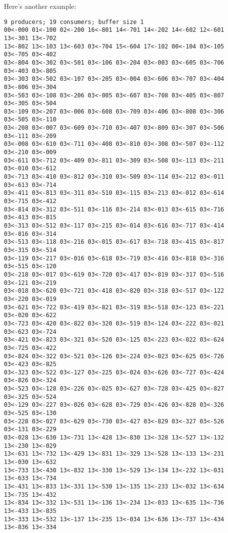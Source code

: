 \documentclass{concdistfoils}
\begin{document}
\begin{slide}
\begin{note}
Here's another example:
\begin{verbatim}
9 producers; 19 consumers; buffer size 1
00<-000 01<-100 02<-200 16<-801 14<-701 14<-202 14<-602 12<-601 13<-301 13<-702
13<-802 13<-103 13<-603 03<-704 15<-604 17<-102 00<-104 03<-105 03<-705 03<-402
03<-804 03<-302 03<-501 03<-106 03<-204 03<-003 03<-605 03<-706 03<-403 03<-805
03<-303 03<-502 03<-107 03<-205 03<-004 03<-606 03<-707 03<-404 03<-806 03<-304
03<-503 03<-108 03<-206 03<-005 03<-607 03<-708 03<-405 03<-807 03<-305 03<-504
03<-109 03<-207 03<-006 03<-608 03<-709 03<-406 03<-808 03<-306 03<-505 03<-110
03<-208 03<-007 03<-609 03<-710 03<-407 03<-809 03<-307 03<-506 03<-111 03<-209
03<-008 03<-610 03<-711 03<-408 03<-810 03<-308 03<-507 03<-112 03<-210 03<-009
03<-611 03<-712 03<-409 03<-811 03<-309 03<-508 03<-113 03<-211 03<-010 03<-612
03<-713 03<-410 03<-812 03<-310 03<-509 03<-114 03<-212 03<-011 03<-613 03<-714
03<-411 03<-813 03<-311 03<-510 03<-115 03<-213 03<-012 03<-614 03<-715 03<-412
03<-814 03<-312 03<-511 03<-116 03<-214 03<-013 03<-615 03<-716 03<-413 03<-815
03<-313 03<-512 03<-117 03<-215 03<-014 03<-616 03<-717 03<-414 03<-816 03<-314
03<-513 03<-118 03<-216 03<-015 03<-617 03<-718 03<-415 03<-817 03<-315 03<-514
03<-119 03<-217 03<-016 03<-618 03<-719 03<-416 03<-818 03<-316 03<-515 03<-120
03<-218 03<-017 03<-619 03<-720 03<-417 03<-819 03<-317 03<-516 03<-121 03<-219
03<-018 03<-620 03<-721 03<-418 03<-820 03<-318 03<-517 03<-122 03<-220 03<-019
03<-621 03<-722 03<-419 03<-821 03<-319 03<-518 03<-123 03<-221 03<-020 03<-622
03<-723 03<-420 03<-822 03<-320 03<-519 03<-124 03<-222 03<-021 03<-623 03<-724
03<-421 03<-823 03<-321 03<-520 03<-125 03<-223 03<-022 03<-624 03<-725 03<-422
03<-824 03<-322 03<-521 03<-126 03<-224 03<-023 03<-625 03<-726 03<-423 03<-825
03<-323 03<-522 03<-127 03<-225 03<-024 03<-626 03<-727 03<-424 03<-826 03<-324
03<-523 03<-128 03<-226 03<-025 03<-627 03<-728 03<-425 03<-827 03<-325 03<-524
03<-129 03<-227 03<-026 03<-628 03<-729 03<-426 03<-828 03<-326 03<-525 03<-130
03<-228 03<-027 03<-629 03<-730 03<-427 03<-829 03<-327 03<-526 03<-131 03<-229
03<-028 13<-630 13<-731 13<-428 13<-830 13<-328 13<-527 13<-132 13<-230 13<-029
13<-631 13<-732 13<-429 13<-831 13<-329 13<-528 13<-133 13<-231 13<-030 13<-632
13<-733 13<-430 13<-832 13<-330 13<-529 13<-134 13<-232 13<-031 13<-633 13<-734
13<-431 13<-833 13<-331 13<-530 13<-135 13<-233 13<-032 13<-634 13<-735 13<-432
13<-834 13<-332 13<-531 13<-136 13<-234 13<-033 13<-635 13<-736 13<-433 13<-835
13<-333 13<-532 13<-137 13<-235 13<-034 13<-636 13<-737 13<-434 13<-836 13<-334

\end{verbatim}
\end{note}
\end{slide}
\end{document}
